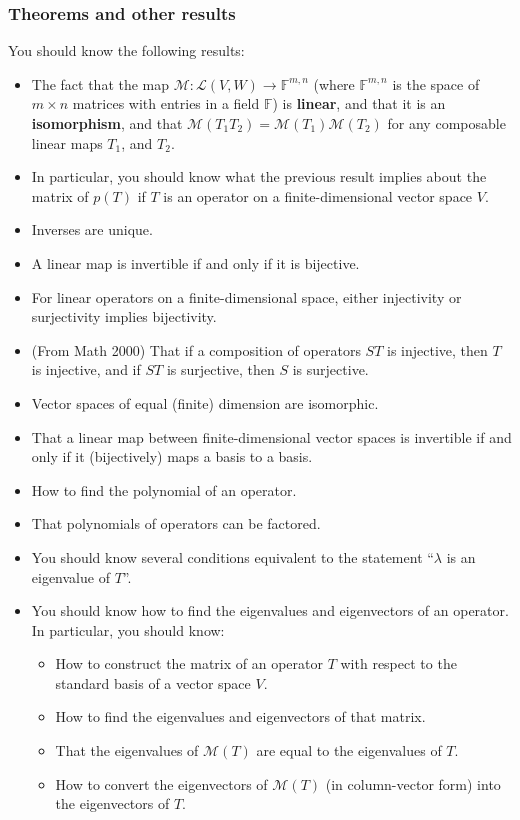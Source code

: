 \documentclass[12pt,letterpaper]{article}
\newcommand{\F}{\mathbb{F}}
\newcommand{\M}{\mathcal{M}}
\begin{document}
\subsubsection*{Theorems and other results}
You should know the following results:
\begin{itemize}
\item The fact that the map $\M:\mathcal{L}(V,W)\to \F^{m,n}$ (where $\F^{m,n}$ is the space of $m\times n$ matrices with entries in a field $\F$) is {\bf linear}, and that it is an {\bf isomorphism}, and that $\M(T_1T_2)=\M(T_1)\M(T_2)$ for any composable linear maps $T_1$, and $T_2$.
\item In particular, you should know what the previous result implies about the matrix of $p(T)$ if $T$ is an operator on a finite-dimensional vector space $V$.
\item Inverses are unique.
\item A linear map is invertible if and only if it is bijective.
\item For linear operators on a finite-dimensional space, either injectivity or surjectivity implies bijectivity.
\item (From Math 2000) That if a composition of operators $ST$ is injective, then $T$ is injective, and if $ST$ is surjective, then $S$ is surjective.
\item Vector spaces of equal (finite) dimension are isomorphic.
\item That a linear map between finite-dimensional vector spaces is invertible if and only if it (bijectively) maps a basis to a basis.
\item How to find the polynomial of an operator.
\item That polynomials of operators can be factored.
\item You should know several conditions equivalent to the statement ``$\lambda$ is an eigenvalue of $T$''.
\item You should know how to find the eigenvalues and eigenvectors of an operator. In particular, you should know:
\begin{itemize}
 \item How to construct the matrix of an operator $T$ with respect to the standard basis of a vector space $V$.
 \item How to find the eigenvalues and eigenvectors of that matrix.
 \item That the eigenvalues of $\M(T)$ are equal to the eigenvalues of $T$.
 \item How to convert the eigenvectors of $\M(T)$ (in column-vector form) into the eigenvectors of $T$.

\end{itemize}
\end{itemize}
\end{document}
